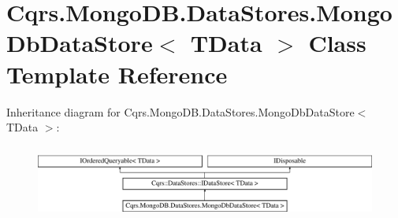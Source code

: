 \hypertarget{classCqrs_1_1MongoDB_1_1DataStores_1_1MongoDbDataStore}{}\section{Cqrs.\+Mongo\+D\+B.\+Data\+Stores.\+Mongo\+Db\+Data\+Store$<$ T\+Data $>$ Class Template Reference}
\label{classCqrs_1_1MongoDB_1_1DataStores_1_1MongoDbDataStore}
Inheritance diagram for Cqrs.\+Mongo\+D\+B.\+Data\+Stores.\+Mongo\+Db\+Data\+Store$<$ T\+Data $>$\+:\begin{figure}[H]
\begin{center}
\leavevmode
\includegraphics[height=2.441860cm]{classCqrs_1_1MongoDB_1_1DataStores_1_1MongoDbDataStore}
\end{center}
\end{figure}
